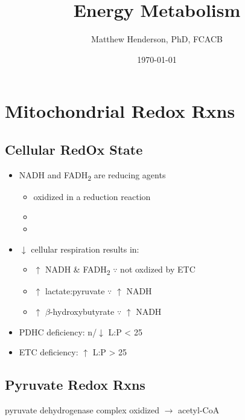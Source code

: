 \documentclass{scrartcl}
\author{Matthew Henderson, PhD, FCACB}
\date{\today}
\title{Energy Metabolism}
\begin{document}
\maketitle
\tableofcontents


\section{Mitochondrial Redox Rxns}
\label{sec:orgeed4e00}
\subsection{Cellular RedOx State}
\label{sec:orgb47332c}
\begin{itemize}
\item NADH and FADH\textsubscript{2} are reducing agents
\begin{itemize}
\item oxidized in a reduction reaction
\item {}
\item {}
\end{itemize}
\item \(\downarrow\) cellular respiration results in:
\begin{itemize}
\item \(\uparrow\) NADH \& FADH\textsubscript{2} \(\because\) not oxdized by ETC
\item \(\uparrow\) lactate:pyruvate \(\because\) \(\uparrow\) NADH
\item \(\uparrow\) \(\beta\)-hydroxybutyrate  \(\because\) \(\uparrow\) NADH
\end{itemize}

\item PDHC deficiency: n/\(\downarrow\) L:P < 25
\item ETC deficiency: \(\uparrow\) L:P > 25
\end{itemize}

\subsection{Pyruvate Redox Rxns}
\label{sec:orgb73c745}
\begin{description}
\item{pyruvate dehydrogenase complex} oxidized \(\to\) acetyl-CoA
\end{description}

\end{document}
